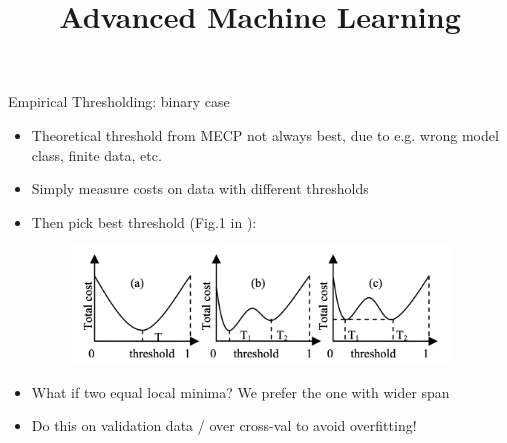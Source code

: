 \documentclass[11pt,compress,t,notes=noshow, xcolor=table]{beamer}
\title{Advanced Machine Learning}
\date{}
\begin{document}



\sloppy



\begin{vbframe}{Empirical Thresholding: binary case}
    \begin{itemize}
        \item Theoretical threshold from MECP not always best, due to e.g. wrong model class, finite data, etc.
        \item Simply measure costs on data with different thresholds
        \item Then pick best threshold (Fig.1 in \href{https://www.aaai.org/Library/AAAI/2006/aaai06-076.php}{}):
        \begin{figure}[h]
            \centering
            \includegraphics[width=0.95\textwidth]{figure/threshold_adjusting.png}
        \end{figure}


        \item What if two equal local minima? We prefer the one with wider span %

        \item Do this on validation data / over cross-val to avoid overfitting!
    \end{itemize}
\end{vbframe}
\end{document}
